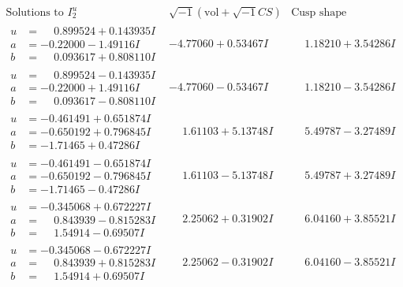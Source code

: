 \documentclass[1p]{elsarticle_modified}
\theoremstyle{definition}
\newcommand{\I}{\sqrt{-1}}
\begin{document}
$$\begin{array}{c|c|c}  
\text{Solutions to }I^u_{2}& \I (\text{vol} + \sqrt{-1}CS) & \text{Cusp shape}\\
 \hline 
\begin{aligned}
u &= \phantom{-}0.899524 + 0.143935 I \\
a &= -0.22000 - 1.49116 I \\
b &= \phantom{-}0.093617 + 0.808110 I\end{aligned}
 & -4.77060 + 0.53467 I & \phantom{-}1.18210 + 3.54286 I \\ \hline\begin{aligned}
u &= \phantom{-}0.899524 - 0.143935 I \\
a &= -0.22000 + 1.49116 I \\
b &= \phantom{-}0.093617 - 0.808110 I\end{aligned}
 & -4.77060 - 0.53467 I & \phantom{-}1.18210 - 3.54286 I \\ \hline\begin{aligned}
u &= -0.461491 + 0.651874 I \\
a &= -0.650192 + 0.796845 I \\
b &= -1.71465 + 0.47286 I\end{aligned}
 & \phantom{-}1.61103 + 5.13748 I & \phantom{-}5.49787 - 3.27489 I \\ \hline\begin{aligned}
u &= -0.461491 - 0.651874 I \\
a &= -0.650192 - 0.796845 I \\
b &= -1.71465 - 0.47286 I\end{aligned}
 & \phantom{-}1.61103 - 5.13748 I & \phantom{-}5.49787 + 3.27489 I \\ \hline\begin{aligned}
u &= -0.345068 + 0.672227 I \\
a &= \phantom{-}0.843939 - 0.815283 I \\
b &= \phantom{-}1.54914 - 0.69507 I\end{aligned}
 & \phantom{-}2.25062 + 0.31902 I & \phantom{-}6.04160 + 3.85521 I \\ \hline\begin{aligned}
u &= -0.345068 - 0.672227 I \\
a &= \phantom{-}0.843939 + 0.815283 I \\
b &= \phantom{-}1.54914 + 0.69507 I\end{aligned}
 & \phantom{-}2.25062 - 0.31902 I & \phantom{-}6.04160 - 3.85521 I \\ \hline\begin{aligned}

\end{aligned}
\end{array}$$
\end{document}
